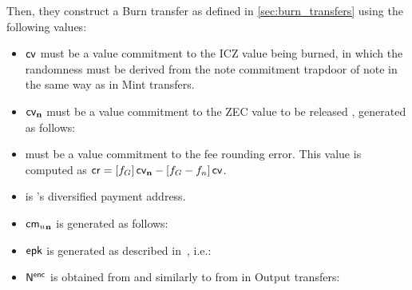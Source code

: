 Then, they construct a Burn transfer as defined in \cref{sec:burn_transfers} using the following values:
\begin{itemize}
    \item $\mathsf{cv}$ must be a value commitment to the ICZ value being burned, in which the randomness must be derived from the note commitment trapdoor of note \n in the same way as \cv in Mint transfers.
    
    \item $\mathsf{cv_{\mathbf{n}}}$ must be a value commitment to the ZEC value to be released \valn, generated as follows:
    
    \item \crem must be a value commitment to the fee rounding error.
    This value is computed as $\mathsf{cr} = [f_G]\,\mathsf{cv_{\mathbf{n}}} - [f_G - f_n]\,\mathsf{cv}$.
    
    \item \dpa is \vault's diversified payment address.
    
    \item $\mathsf{{cm_{\mathnormal{u}}}_{\mathbf{n}}}$ is generated as follows:
    
    \item $\mathsf{epk}$ is generated as described in~\cite[Sections 4.6.2 and 4.17.1]{hopwood2016zcash}, i.e.:
    
    \item $\mathsf{N^{enc}}$ is obtained from \n and \val similarly to \cenc from \np in Output transfers:
    

\end{itemize}
